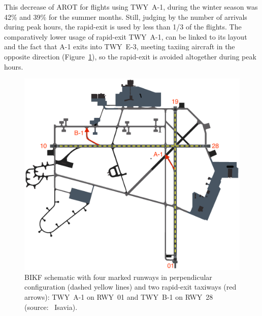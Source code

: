 \begin{table}[h]
\centering
{}
\caption[AROTs RWY-01 with rapid-exit by season]{AROTs for runway RWY-01 with rapid-exit TWY A-1 by season. The count is the number of landings during peak hours from July 2017 to November 2018.}
\label{tab:season_AROT_stats_RWY01_post_fast_exit}
\end{table}

This decrease of AROT for flights using TWY~A-1, during the winter season was 42\% and 39\% for the summer months. Still, judging by the number of arrivals during peak hours, the rapid-exit is used by less than 1/3 of the flights. The comparatively lower usage of rapid-exit TWY~A-1, can be linked to its layout and the fact that A-1 exits into TWY~E-3, meeting taxiing aircraft in the opposite direction (Figure~\ref{fig:BIKF_schematic}), so the rapid-exit is avoided altogether during peak hours.

\begin{figure}[h]
    \centering
    \includegraphics[width=1\textwidth]{graphics/BIKF_schematic.png}
    \caption[BIKF schematic]{BIKF schematic with four marked runways in perpendicular configuration (dashed yellow lines) and two rapid-exit taxiways (red arrows): TWY~A-1 on RWY~01 and TWY~B-1 on RWY~28 (source:~ Isavia).}
    \label{fig:BIKF_schematic}
\end{figure}

